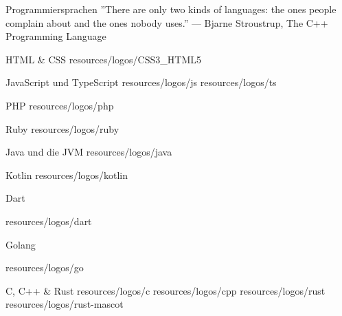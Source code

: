 \begin{frame}{Programmiersprachen}
    ''There are only two kinds of languages: the ones people complain about and the ones nobody uses.''
    — Bjarne Stroustrup, The C++ Programming Language

\end{frame}

\begin{frame}{HTML \& CSS}
    \WithImages{

    }
    {resources/logos/CSS3_HTML5}
    \stopimages
\end{frame}

\begin{frame}{JavaScript und TypeScript}
    \WithImages{

    }
    {resources/logos/js}
    {resources/logos/ts}
    \stopimages

\end{frame}

\begin{frame}{PHP}
    \WithImages{

    }
    {resources/logos/php}
    \stopimages
\end{frame}

\begin{frame}{Ruby}
    \WithImages{

    }
    {resources/logos/ruby}
    \stopimages
\end{frame}

\begin{frame}{Java und die JVM}
    {resources/logos/java}
    \stopimages
\end{frame}

\begin{frame}{Kotlin}
    \WithImages{

    }
    {resources/logos/kotlin}
    \stopimages

\end{frame}
\begin{frame}{Dart}

    \WithImages{

    }
    {resources/logos/dart}
    \stopimages

\end{frame}

\begin{frame}{Golang}

    \WithImages{

    }
    {resources/logos/go}
    \stopimages

\end{frame}
\begin{frame}{C, C++ \& Rust}
    \WithImages{

    }
    {resources/logos/c}
    {resources/logos/cpp}
    {resources/logos/rust}
    {resources/logos/rust-mascot}
    \stopimages

\end{frame}

